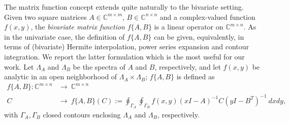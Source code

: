 \documentclass{siamart1116}
\begin{document}
 The matrix function concept extends quite naturally to the bivariate setting. Given  two  square matrices $A\in\mathbb C^{m\times m}$, $B\in\mathbb C^{n\times n}$  and a complex-valued function $f(x,y)$, the
\emph{bivariate matrix function} $f\{A,B\}$ \cite{kressner2011bivariate} is a linear operator on $\mathbb C^{m\times n}$. As in the univariate case, the  definition of $f\{A,B\}$ can be given, equivalently, in terms of (bivariate) Hermite interpolation, power series expansion and contour integration. We report the latter formulation which is the most useful for our work. Let $\Lambda_A$ and $\Lambda_B$ be the spectra of $A$ and $B$, respectively, and let $f(x,y)$ be analytic in an open neighborhood of $\Lambda_A\times\Lambda_B$; $f\{A,B\}$ is defined as
\begin{align}
f\{A,B\}:\mathbb C^{m\times n}&\longrightarrow\  \mathbb C^{m\times n}\nonumber\\
C\qquad&\longrightarrow\  f\{A,B\}(C):=\oint_{\Gamma_A}\oint_{\Gamma_B}f(x,y)(xI-A)^{-1}C(yI-B^T)^{-1}\ dxdy,\label{eq:cauchy-def}
\end{align}
with $\Gamma_A,\Gamma_B$ closed contours enclosing $\Lambda_A$ and $\Lambda_B$, respectively. 
\end{document}
